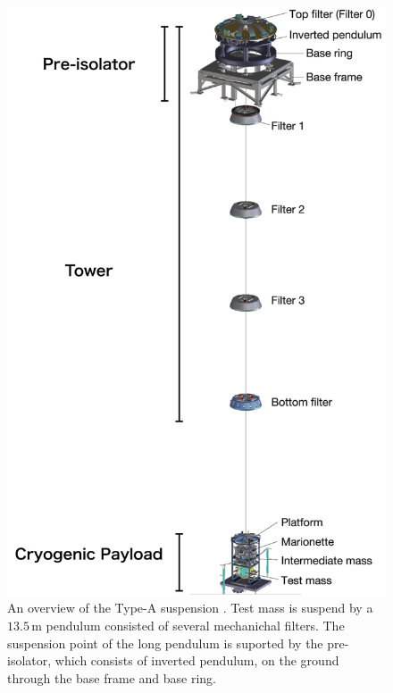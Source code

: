 \begin{figure}[p]
  \begin{center}   
    \includegraphics[width=13cm]{./img_chap6/img604.png}
    \caption{An overview of the Type-A suspension \cite{Okutomi2019development}. Test mass is suspend by a $13.5\,\mathrm{m}$ pendulum consisted of several mechanichal filters. The suspension point of the long pendulum is suported by the pre-isolator, which consists of inverted pendulum, on the ground through the base frame and base ring.}\label{img:img604}
  \end{center}
\end{figure}

